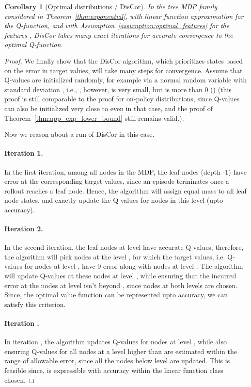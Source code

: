 \documentclass[jmlr]{article}
\newtheorem{corollary}{Corollary}[theorem]
\begin{document}
\begin{corollary}[Optimal distributions / DisCor]
\label{thm:discor_suboptimal}
In the tree MDP family considered in Theorem~\ref{thm:exponential}, with linear function approximation for the Q-function, and with Assumption~\ref{assumption:optimal_features} for the features , DisCor takes  many exact iterations for accurate convergence to the optimal Q-function.
\end{corollary}
\begin{proof}
We finally show that the DisCor algorithm, which prioritizes states based on the error in target values, will take  many steps for convergence. Assume that Q-values are initialized randomly, for example via a normal random variable with standard deviation , i.e., , however,  is very small, but is more than 0 () (this proof is still comparable to the proof for on-policy distributions, since Q-values can also be initialized very close to  even in that case, and the proof of Theorem~\ref{thm:app_exp_lower_bound} still remains valid.). 

Now we reason about a run of DisCor in this case.

\paragraph{Iteration 1.} In the first iteration, among all nodes in the MDP, the leaf nodes (depth -1) have  error at the corresponding target values, since an episode terminates once a rollout reaches a leaf node. Hence, the algorithm will assign equal mass to all leaf node states, and exactly update the Q-values for nodes in this level (upto -accuracy).

\paragraph{Iteration 2.} In the second iteration, the leaf nodes at level  have accurate Q-values, therefore, the algorithm will pick nodes at the level , for which the target values, i.e. Q-values for nodes at level , have 0 error along with nodes at level . The algorithm will update Q-values at these nodes at level , while ensuring that the incurred error at the nodes at level  isn't beyond , since nodes at both levels are chosen. Since, the optimal value function  can be represented upto accuracy, we can satisfy this criterion.

\paragraph{Iteration .} In iteration , the algorithm updates Q-values for nodes at level , while also ensuring Q-values for all nodes at a level higher than  are estimated within the range of allowable error, since all the nodes below level  are updated. This is feasible since,  is expressible with accuracy within the linear function class chosen. 


\end{proof}
\end{document}
